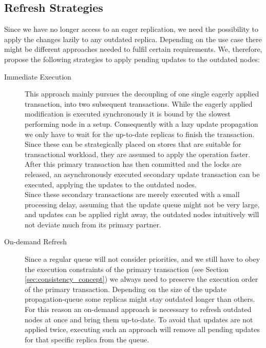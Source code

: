 \subsection{Refresh Strategies}
\label{sec:refresh_strategies}

Since we have no longer access to an eager replication, we need the possibility to apply the changes lazily to any outdated replica.
Depending on the use case there might be different approaches needed to fulfil certain requirements.
We, therefore, propose the following strategies to apply pending updates to the outdated nodes:

\begin{description}
    \item[Immediate Execution] This approach mainly pursues the decoupling of one single eagerly applied transaction, into two subsequent transactions.
    While the eagerly applied modification is executed synchronously it is bound by the slowest performing node in a setup.
    Consequently with a lazy update propagation we only have to wait for the up-to-date replicas to finish the transaction.
    Since these can be strategically placed on stores that are suitable for transactional workload, they are assumed to apply the operation faster.
    After this primary transaction has then committed and the locks are released, an asynchronously executed secondary update transaction can be executed, 
    applying the updates to the outdated nodes.\\
    Since these secondary transactions are merely executed with a small processing delay, assuming that the update queue might not be very large, 
    and updates can be applied right away, the outdated nodes intuitively will not deviate much from its primary partner.

    \item[On-demand Refresh] Since a regular queue will not consider priorities, and we still have to obey the execution constraints of the primary transaction (see Section \ref{sec:consistency_concept})
    we always need to preserve the execution order of the primary transaction. Depending on the size of the update propagation-queue some replicas might stay outdated longer than others.
    For this reason an on-demand approach is necessary to refresh outdated nodes at once and bring them up-to-date.
    To avoid that updates are not applied twice, executing such an approach will remove all pending updates for that specific replica from the queue.
    

\end{description}
